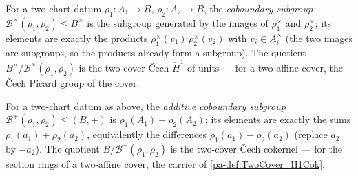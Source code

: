 \begin{definition}
  \label{pa-def:cech_coboundary_units}
  \leanok

  For a two-chart datum \(\rho_1 : A_1 \to B\), \(\rho_2 : A_2 \to B\), the
  \emph{coboundary subgroup} \(\mathcal B^\times(\rho_1, \rho_2) \leq B^\times\) is the
  subgroup generated by the images of \(\rho_1^\times\) and \(\rho_2^\times\); its
  elements are exactly the products \(\rho_1^\times(v_1)\,\rho_2^\times(v_2)\) with
  \(v_i \in A_i^\times\) (the two images are subgroups, so the products already form a
  subgroup). The quotient \(B^\times / \mathcal B^\times(\rho_1, \rho_2)\) is the
  two-cover \v{C}ech \(\check H^1\) of units --- for a two-affine cover, the \v{C}ech
  Picard group of the cover.
\end{definition}

\begin{definition}
  \label{pa-def:cech_coboundary_add}
  \leanok

  For a two-chart datum as above, the \emph{additive coboundary subgroup}
  \(\mathcal B^+(\rho_1, \rho_2) \leq (B, +)\) is
  \(\rho_1(A_1) + \rho_2(A_2)\); its elements are exactly the sums
  \(\rho_1(a_1) + \rho_2(a_2)\), equivalently the differences
  \(\rho_1(a_1) - \rho_2(a_2)\) (replace \(a_2\) by \(-a_2\)). The quotient
  \(B / \mathcal B^+(\rho_1, \rho_2)\) is the two-cover \v{C}ech cokernel --- for the
  section rings of a two-affine cover, the carrier of \ref{pa-def:TwoCover_H1Cok}.
\end{definition}

